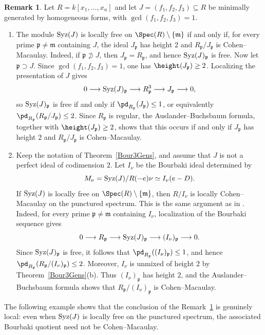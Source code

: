 \documentclass[11pt]{amsart} %
\newcommand{\lar}{\longrightarrow}
\theoremstyle{definition}
\newtheorem{Remark}[Theorem]{Remark}
\def\syz{\mbox{\rm Syz}}
\def\fm{{\mathfrak m}}
\def\fp{{\mathfrak p}}
\def\fm{{\mathfrak m}}
\begin{document}
\begin{Remark}\label{rem:syz-locally-free-and-Bourbaki-CM}
Let $R=k[x_1,\ldots,x_n]$ and let $J=(f_1,f_2,f_3)\subseteq R$ be minimally generated by homogeneous forms, with $\gcd(f_1,f_2,f_3)=1$.
\begin{enumerate}
\item[\rm(i)] The module $\syz(J)$ is locally free on $\Spec(R)\setminus\{\fm\}$ if and only if, for every prime $\fp \neq\fm$ containing $J$, the ideal $J_\fp$ has height $2$ and $R_\fp/J_\fp$ is Cohen--Macaulay. Indeed, if $\fp \not\supset J$, then $J_\fp=R_\fp$, and hence $\syz(J)_\fp$ is free. Now let $\fp \supset J$. Since $\gcd(f_1,f_2,f_3)=1$, one has $\height(J_\fp)\geq2$. Localizing the presentation of $J$ gives
\[
0\lar\syz(J)_\fp\lar R_\fp^3\lar J_\fp\lar0,
\]
so $\syz(J)_\fp$ is free if and only if $\pd_{R_\fp}(J_\fp)\leq1$, or equivalently $\pd_{R_\fp}(R_\fp/J_\fp)\leq2$. Since $R_\fp$ is regular, the Auslander--Buchsbaum formula, together with $\height(J_\fp)\geq2$, shows that this occurs if and only if $J_\fp$ has height $2$ and $R_\fp/J_\fp$ is Cohen--Macaulay.

\item[\rm(ii)] Keep the notation of Theorem~\ref{Bour3Gens}, and assume that $J$ is not a perfect ideal of codimension $2$. Let $I_\nu$ be the Bourbaki ideal determined by
\[
M_\nu=\syz(J)/R(-e)\nu\simeq I_\nu(e-D).
\]
If $\syz(J)$ is locally free on $\Spec(R)\setminus\{\fm\}$, then $R/I_\nu$ is locally Cohen--Macaulay on the punctured spectrum. This is the same argument as in \cite[Proposition~2.5]{MFA}. Indeed, for every prime $\fp \neq\fm$ containing $I_\nu$, localization of the Bourbaki sequence gives
\[
0\lar R_\fp\lar\syz(J)_\fp\lar(I_\nu)_\fp\lar0.
\]
Since $\syz(J)_\fp$ is free, it follows that $\pd_{R_\fp}((I_\nu)_\fp)\leq1$, and hence $\pd_{R_\fp}(R_\fp/(I_\nu)_\fp)\leq2$. Moreover, $I_\nu$ is unmixed of height $2$ by Theorem~\ref{Bour3Gens}{\rm(b)}. Thus $(I_\nu)_\fp$ has height $2$, and the Auslander--Buchsbaum formula shows that $R_\fp/(I_\nu)_\fp$ is Cohen--Macaulay.
\end{enumerate}
\end{Remark}

The following example shows that the conclusion of the Remark~\ref{rem:syz-locally-free-and-Bourbaki-CM} is genuinely local: even when $\syz(J)$ is locally free on the punctured spectrum, the associated Bourbaki quotient need not be Cohen--Macaulay.
\end{document}
